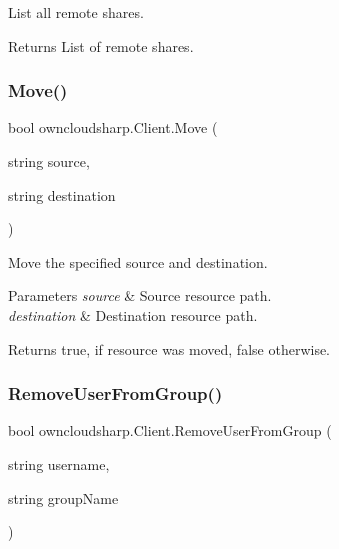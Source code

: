 List all remote shares. 

\begin{DoxyReturn}{Returns}
List of remote shares.
\end{DoxyReturn}
\mbox{\label{classowncloudsharp_1_1_client_a2ea83b74c926b1ff7a8443f75bf4ebd2}} 
\subsubsection{\texorpdfstring{Move()}{Move()}}
{\footnotesize\ttfamily bool owncloudsharp.\+Client.\+Move (\begin{DoxyParamCaption}\item[{string}]{source,  }\item[{string}]{destination }\end{DoxyParamCaption})}



Move the specified source and destination. 


\begin{DoxyParams}{Parameters}
{\em source} & Source resource path.\\
\hline
{\em destination} & Destination resource path.\\
\hline
\end{DoxyParams}
\begin{DoxyReturn}{Returns}
{\ttfamily true}, if resource was moved, {\ttfamily false} otherwise.
\end{DoxyReturn}
\mbox{\label{classowncloudsharp_1_1_client_a8c2bcb8ca08d661bb4c15b8cc07eaf5d}} 
\subsubsection{\texorpdfstring{Remove\+User\+From\+Group()}{RemoveUserFromGroup()}}
{\footnotesize\ttfamily bool owncloudsharp.\+Client.\+Remove\+User\+From\+Group (\begin{DoxyParamCaption}\item[{string}]{username,  }\item[{string}]{group\+Name }\end{DoxyParamCaption})}




